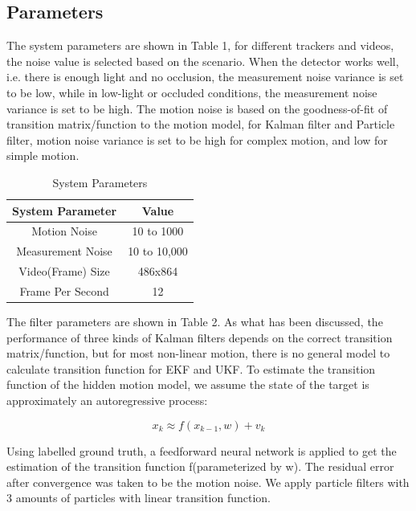 \documentclass[10pt,twocolumn,letterpaper]{article}
\begin{document}
\subsection{Parameters}

The system parameters are shown in Table 1, for different trackers and videos, the noise value is selected based on the scenario. When the detector works well, i.e. there is enough light and no occlusion, the measurement noise variance is set to be low, while in low-light or occluded conditions, the measurement noise variance is set to be high. The motion noise is based on the goodness-of-fit of transition matrix/function to the motion model, for Kalman filter and Particle filter, motion noise variance is set to be high for complex motion, and low for simple motion.

\begin{table}[h!]
  \centering
  \caption{System Parameters}
  \label{tab:table1}
  \begin{tabular}{|c|c|}
    \toprule
    \textbf{System Parameter} & \textbf{Value}  \\ \hline
    \midrule
  Motion Noise & 10 to 1000  \\ \hline
    Measurement Noise & 10 to 10,000  \\ \hline
    Video(Frame) Size & 486x864  \\ \hline
    Frame Per Second & 12  \\ 
    \bottomrule
  \end{tabular}
\end{table}

The filter parameters are shown in Table 2. As what has been discussed, the performance of three kinds of Kalman filters depends on the correct transition matrix/function, but for most non-linear motion, there is no general model to calculate transition function for EKF and UKF. To estimate the transition function of the hidden motion model, we assume the state of the target is approximately an autoregressive process:

\begin{equation}
x_k \approx f(x_{k-1},w)+v_k
\end{equation}

Using labelled ground truth, a feedforward neural network is applied to get the estimation of the transition function f(parameterized by w). The residual error after convergence was taken to be the motion noise. We apply particle filters with 3 amounts of particles with linear transition function.
\end{document}
